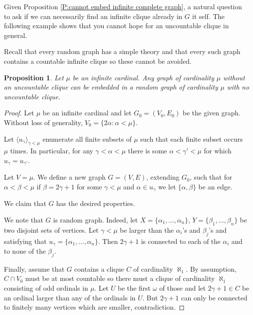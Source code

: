 \documentclass[a4paper]{amsart}
\theoremstyle{plain}
\newtheorem{proposition}[theorem]{Proposition}
\theoremstyle{definition}
\theoremstyle{remark}
\numberwithin{equation}{section}
\begin{document}
Given Proposition \ref{P:cannot embed infinite complete graph}, a natural question to ask if we can necessarily find an infinite clique already in $G$ it self. The following example shows that you cannot hope for an uncountable clique in general.

Recall that every random graph has a simple theory and that every such graph contains a countable infinite clique so these cannot be avoided.

\begin{proposition}\label{P:embed into random}
Let $\mu$ be an infinite cardinal. Any graph of cardinality $\mu$ without an uncountable clique can be embedded in a random graph of cardinality $\mu$ with no uncountable clique.
%
\end{proposition}
\begin{proof}
Let $\mu$ be an infinite cardinal and let $G_0=(V_0,E_0)$ be the given graph. Without loss of generality, $V_0=\{2\alpha: \alpha<\mu\}$.



Let $\langle u_\gamma\rangle_{\gamma<\mu}$ enumerate all finite subsets of $\mu$ such that  each finite subset  occurs $\mu$ times. In particular, for any $\gamma<\alpha<\mu$ there is some $\alpha<\gamma'<\mu$ for which $u_\gamma=u_{\gamma'}$.

Let $V=\mu$. We define a new graph $G=(V,E)$, extending $G_0$, such that for $\alpha< \beta<\mu$ if $\beta=2\gamma+1$ for some $\gamma<\mu$ and $\alpha\in u_\gamma$ we let $\{\alpha,\beta\}$ be an edge.

We claim that $G$ has the desired properties. 

We note that $G$ is random graph. Indeed, let $X=\{\alpha_1,\dots,\alpha_n\},\,Y=\{\beta_1,\dots,\beta_n\}$ be two disjoint sets of vertices. Let $\gamma<\mu$ be  larger than the $\alpha_i$'s and $\beta_j$'s and satisfying that $u_\gamma=\{\alpha_1,\dots, \alpha_n\}$. Then $2\gamma+1$ is connected to each of the $\alpha_i$ and to none of the $\beta_j$.

Finally, assume that $G$ contains a clique $C$ of cardinality $\aleph_1$. By assumption, $C\cap V_0$ must be at most countable so there must a clique of cardinality $\aleph_1$ consisting of odd ordinals in $\mu$. Let $U$ be the first $\omega$ of those and let $2\gamma+1\in C$ be an ordinal larger than any of the ordinals in $U$. But $2\gamma+1$ can only be connected to finitely many vertices which are smaller, contradiction. 
\end{proof}
\end{document}
